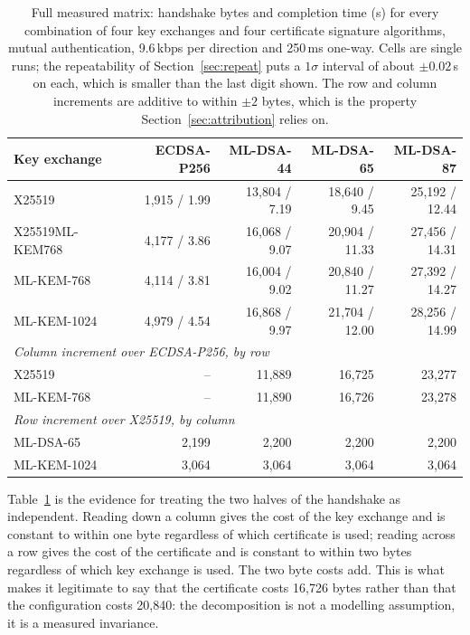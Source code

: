 \documentclass[drones,article,submit,pdftex,moreauthors]{Definitions/mdpi}
\newcommand{\kbps}{kbps}
\newcommand{\mlkem}{ML-KEM}
\newcommand{\mldsa}{ML-DSA}
\begin{document}
\begin{table}[H]
\caption{Full measured matrix: handshake bytes and completion time (s)
for every combination of four key exchanges and four certificate
signature algorithms, mutual authentication, 9.6\,\kbps{} per direction
and 250\,ms one-way. Cells are single runs; the repeatability of
Section~\ref{sec:repeat} puts a $1\sigma$ interval of about $\pm0.02$\,s
on each, which is smaller than the last digit shown. The row and column
increments are additive to within $\pm 2$ bytes, which is the property
Section~\ref{sec:attribution} relies on.}
\label{tab:matrix}
\centering
\begin{tabular}{lrrrr}
\toprule
Key exchange & ECDSA-P256 & \mldsa{}-44 & \mldsa{}-65 & \mldsa{}-87 \\
\midrule
X25519          & 1{,}915 / 1.99  & 13{,}804 / 7.19 & 18{,}640 / 9.45  & 25{,}192 / 12.44 \\
X25519\mlkem{}768 & 4{,}177 / 3.86 & 16{,}068 / 9.07 & 20{,}904 / 11.33 & 27{,}456 / 14.31 \\
\mlkem{}-768    & 4{,}114 / 3.81  & 16{,}004 / 9.02 & 20{,}840 / 11.27 & 27{,}392 / 14.27 \\
\mlkem{}-1024   & 4{,}979 / 4.54  & 16{,}868 / 9.97 & 21{,}704 / 12.00 & 28{,}256 / 14.99 \\
\midrule
\multicolumn{5}{l}{\emph{Column increment over ECDSA-P256, by row}} \\
X25519          & -- & 11{,}889 & 16{,}725 & 23{,}277 \\
\mlkem{}-768    & -- & 11{,}890 & 16{,}726 & 23{,}278 \\
\midrule
\multicolumn{5}{l}{\emph{Row increment over X25519, by column}} \\
\mldsa{}-65      & 2{,}199 & 2{,}200 & 2{,}200 & 2{,}200 \\
\mlkem{}-1024   & 3{,}064 & 3{,}064 & 3{,}064 & 3{,}064 \\
\bottomrule
\end{tabular}
\end{table}

Table~\ref{tab:matrix} is the evidence for treating the two halves of
the handshake as independent. Reading down a column gives the cost of
the key exchange and is constant to within one byte regardless of which
certificate is used; reading across a row gives the cost of the
certificate and is constant to within two bytes regardless of which key
exchange is used. The two byte costs add. This is what makes it
legitimate to say that the certificate costs 16{,}726 bytes rather than
that the configuration costs 20{,}840: the decomposition is not a
modelling assumption, it is a measured invariance.
\end{document}
